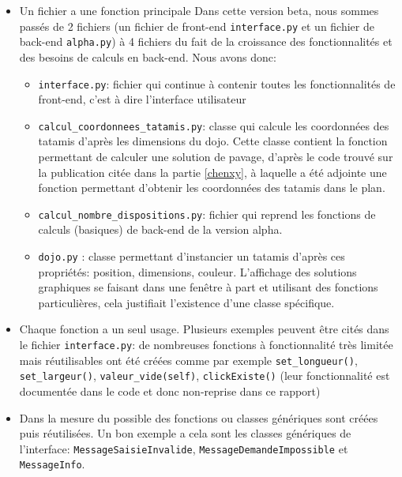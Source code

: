 \begin{itemize}
    \item Un fichier a une fonction principale
          Dans cette version beta, nous sommes passés de 2 fichiers (un fichier de front-end \texttt{interface.py} et un fichier de back-end \texttt{alpha.py}) à
          4 fichiers du fait de la croissance des fonctionnalités et des besoins de calculs en back-end. Nous avons donc:
          \begin{itemize}
              \item \texttt{interface.py}: fichier qui continue à contenir toutes les fonctionnalités de front-end, c’est à dire l’interface utilisateur
              \item \texttt{calcul\_coordonnees\_tatamis.py}: classe qui calcule les coordonnées des tatamis d'après les dimensions du dojo.
                    Cette classe contient la fonction permettant de calculer une solution de pavage, d’après le code trouvé sur la publication
                    citée dans la partie \ref{chenxy}, à laquelle a été adjointe une fonction permettant d’obtenir les coordonnées des tatamis dans le plan.
              \item \texttt{calcul\_nombre\_dispositions.py}: fichier qui reprend les fonctions de calculs (basiques) de back-end de la version alpha.
              \item \texttt{dojo.py} : classe permettant d'instancier un tatamis d'après ces propriétés: position, dimensions, couleur. L’affichage
                    des solutions graphiques se faisant dans une fenêtre à part et utilisant des fonctions particulières, cela justifiait
                    l’existence d’une classe spécifique.
          \end{itemize}
    \item Chaque fonction a un seul usage. Plusieurs exemples peuvent être cités dans le fichier \texttt{interface.py}: de nombreuses
          fonctions à fonctionnalité très limitée mais réutilisables ont été créées comme par exemple \texttt{set\_longueur()}, \texttt{set\_largeur()},
          \texttt{valeur\_vide(self)}, \texttt{clickExiste()} (leur fonctionnalité est documentée dans le code et donc non-reprise dans ce rapport)

    \item Dans la mesure du possible des fonctions ou classes génériques sont créées puis réutilisées.
          Un bon exemple a cela sont les classes génériques de l’interface: \texttt{MessageSaisieInvalide}, \texttt{MessageDemandeImpossible} et \texttt{MessageInfo}.
\end{itemize}



